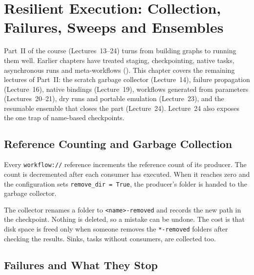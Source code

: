 \chapter{Resilient Execution: Collection, Failures, Sweeps and Ensembles}
\label{ch:resilient}

Part~II of the course (Lectures~13--24) turns from building graphs to running
them well. Earlier chapters have treated staging, checkpointing, native tasks,
asynchronous runs and meta-workflows ().
This chapter covers the remaining lectures of Part~II: the scratch garbage
collector (Lecture~14), failure propagation (Lecture~16), native bindings
(Lecture~19), workflows generated from parameters (Lectures~20--21), dry runs
and portable emulation (Lecture~23), and the resumable ensemble that closes
the part (Lecture~24). Lecture~24 also exposes the one trap of name-based
checkpoints.

\section{Reference Counting and Garbage Collection}

Every \texttt{workflow://} reference increments the reference count of its
producer. The count is decremented after each consumer has executed. When it
reaches zero and the configuration sets \texttt{remove\_dir = True}, the
producer's folder is handed to the garbage collector.





\begin{cautionbox}
The collector renames a folder to \texttt{<name>-removed} and records the new
path in the checkpoint. Nothing is deleted, so a mistake can be undone. The
cost is that disk space is freed only when someone removes the
\texttt{*-removed} folders after checking the results. Sinks, tasks without
consumers, are collected too.
\end{cautionbox}

\section{Failures and What They Stop}

